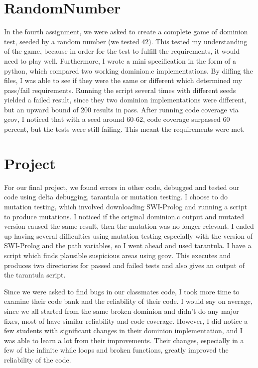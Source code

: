 \documentclass[titlepage]{article}
\begin{document}
\section{RandomNumber}
\begin{singlespace}
In the fourth assignment, we were asked to create a complete game of dominion test, seeded by a random number (we tested 42). This tested my understanding of the game, because in order for the test to fulfill the requirements, it would need to play well. Furthermore, I wrote a mini specification in the form of a python, which compared two working dominion.c implementations. By diffing the files, I was able to see if they were the same or different which determined my pass/fail requirements. Running the script several times with different seeds yielded a failed result, since they two dominion implementations were different, but an upward bound of 200 results in pass. After running code coverage via gcov, I noticed that with a seed around 60-62, code coverage surpassed 60 percent, but the tests were still failing. This meant the requirements were met. 
\end{singlespace}

\section{Project}
\begin{singlespace}
For our final project, we found errors in other code, debugged and tested our code using delta debugging, tarantula or mutation testing. I choose to do mutation testing, which involved downloading SWI-Prolog and running a script to produce mutations. I noticed if the original dominion.c output and mutated version caused the same result, then the mutation was no longer relevant. I ended up having several difficulties using mutation testing especially with the version of SWI-Prolog and the path variables, so I went ahead and used tarantula. I have a script which finds plausible suspicious areas using gcov. This executes and produces two directories for passed and failed tests and also gives an output of the tarantula script. 
\end{singlespace}

\begin{singlespace}
Since we were asked to find bugs in our classmates code, I took more time to examine their code bank and the reliability of their code. I would say on average, since we all started from the same broken dominion and didn’t do any major fixes, most of have similar reliability and code coverage. However, I did notice a few students with significant changes in their dominion implementation, and I was able to learn a lot from their improvements. Their changes, especially in a few of the infinite while loops and broken functions, greatly improved the reliability of the code.
\end{singlespace}
\end{document}
